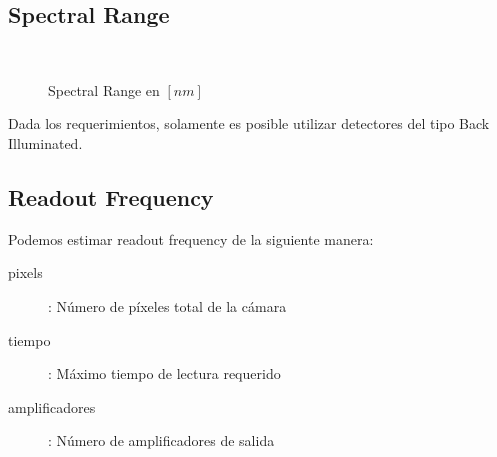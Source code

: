\documentclass[a4paper,10pt]{article}
\begin{document}
\subsection{Spectral Range}
\begin{figure}[ht!]
  \centering
  ~ 
  \caption{Spectral Range en $[nm]$}
  \label{fig:p3_b}
\end{figure}
Dada los requerimientos, solamente es posible utilizar detectores del tipo Back Illuminated.
\newpage
\subsection{Readout Frequency}
Podemos estimar readout frequency de la siguiente manera:
\begin{description}
\item [pixels]: Número de píxeles total de la cámara
\item [tiempo]: Máximo tiempo de lectura requerido
\item [amplificadores]: Número de amplificadores de salida
\end{description}
\end{document}
